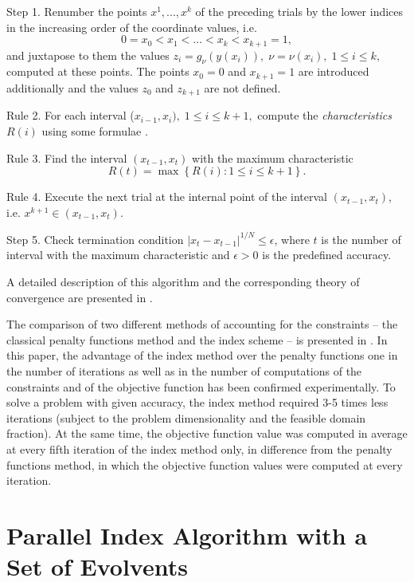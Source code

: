 \documentclass[smallextended]{svjour3}       %
\begin{document}
Step 1. Renumber the points $x^1,...,x^k$ of the preceding trials by the lower indices in the 
increasing order of the coordinate values, i.e.
\[
0=x_0<x_1<\dots <x_k<x_{k+1}=1,
\]
and juxtapose to them the values $z_i=g_\nu(y(x_i)), \; \nu=\nu(x_i), \; 1 \leq i \leq k,$ computed 
at these points. The points $x_0=0$ and $x_{k+1}=1$ are introduced additionally and the 
values $z_0$ and $z_{k+1}$ are not defined.

Rule 2. For each interval ($x_{i-1},x_i), \; 1 \leq i \leq k+1,$ compute the \textit{characteristics} 
$R(i)$ using some formulae \cite{Barkalov2002}.

Rule 3. Find the interval $(x_{t-1},x_t)$ with the maximum characteristic
\begin{equation}\label{MaxR}
R(t)=\max{\left\{R(i): 1 \leq i \leq k+1\right\}}.
\end{equation}

Rule 4. Execute the next trial at the internal point of the interval $(x_{t-1},x_t)$, i.e. $x^{k+1} 
\in (x_{t-1},x_t)$.

Step 5. Check termination condition $\left|x_t-x_{t-1}\right|^{1/N}\leq \epsilon$, where $t$ is 
the number of interval with the maximum characteristic and $\epsilon > 0$ is the predefined 
accuracy.

A detailed description of this algorithm and the corresponding theory of convergence are 
presented in \cite{Strongin2000,Sergeyev2001,Barkalov2002}.

The comparison of two different methods of accounting for the constraints -- the classical 
penalty functions method and the index scheme -- is presented in \cite{Barkalov2017}. In 
this paper, the advantage of the index method over the penalty functions one in the number of 
iterations as well as in the number of computations of the constraints and of the objective 
function has been confirmed experimentally. To solve a problem with given accuracy, the index 
method required 3-5 times less iterations (subject to the problem dimensionality and the feasible 
domain fraction). At the same time, the objective function value was computed in average at 
every fifth iteration of the index method only, in difference from the penalty functions method, 
in which the objective function values were computed at every iteration.


\section{Parallel Index Algorithm with a Set of Evolvents}
\label{sec:3}
\end{document}
